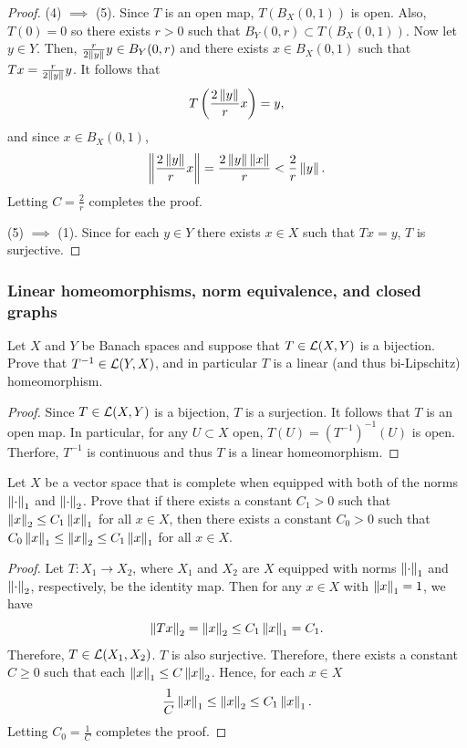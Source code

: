 \documentclass[a4paper]{article}
\begin{document}
\begin{proof}
  (4) $\implies$ (5). Since $T$ is an open map, $T(B_X(0, 1))$ is
  open. Also, $T(0) = 0$ so there exists $r > 0$ such that
  $B_Y(0, r) \subset T(B_X(0, 1))$. Now let $y \in Y$. Then,
  $\frac{r}{2 \left\lVert y\right\rVert} y \in B_Y(0, r)$ and there exists
  $x \in B_X(0, 1)$ such that $Tx = \frac{r}{2 \left\lVert y\right\rVert} y$.
  It follows that
  \[
  T \left( \frac{2\left\lVert y\right\rVert}{r} x \right) = y,
  \]
  and since $x \in B_X(0, 1)$,
  \[
  \left\lVert \frac{2 \left\lVert y\right\rVert}{r} x\right\rVert = \frac{2 \left\lVert y\right\rVert \left\lVert x\right\rVert}{r}
  < \frac{2}{r} \left\lVert y\right\rVert.
  \]
  Letting $C = \frac{2}{r}$ completes the proof.

  (5) $\implies$ (1). Since for each $y \in Y$ there exists
  $x \in X$ such that $T x = y$, $T$ is surjective.

\end{proof}

\subsubsection*{Linear homeomorphisms, norm equivalence,
and closed graphs}
\begin{thm}
  Let $X$ and $Y$ be Banach spaces and suppose that
  $T \in \mathcal{L}(X,Y)$ is a bijection.  Prove that $T^{-1}
  \in \mathcal{L}(Y,X)$, and in particular $T$ is a linear
  (and thus bi-Lipschitz) homeomorphism.
\end{thm}

\begin{proof}
  Since $T \in \mathcal{L}(X, Y)$ is a bijection, $T$ is a surjection.
  It follows that $T$ is an open map. In particular, for any
  $U \subset X$ open, $T(U) = (T^{-1})^{-1}(U)$ is open. Therfore,
  $T^{-1}$ is continuous and thus $T$ is a linear homeomorphism.

\end{proof}

\begin{thm}
Let $X$ be a vector space that is complete when equipped
with both of the norms $\left\lVert \cdot\right\rVert_1$ and
$\left\lVert \cdot\right\rVert_2$.  Prove that if there exists a constant
$C_1>0$ such that $\left\lVert x\right\rVert_2 \le C_1 \left\lVert x\right\rVert_1$ for all
$x \in X$, then there exists a constant $C_0 >0$ such that
$C_0 \left\lVert x\right\rVert_1 \le \left\lVert x\right\rVert_2 \le C_1 \left\lVert x\right\rVert_1$ for all
$x \in X$.
\end{thm}

\begin{proof}
Let $T: X_1 \to X_2$, where $X_1$ and $X_2$
are $X$ equipped with norms $\left\lVert \cdot\right\rVert_1$ and $\left\lVert \cdot\right\rVert_2$,
respectively, be the identity map. Then for any $x \in X$
with $\left\lVert x\right\rVert_1 = 1$, we have
\[
\left\lVert T x\right\rVert_2 = \left\lVert x\right\rVert_2 \leq C_1 \left\lVert x\right\rVert_1 = C_1.
\]
Therefore, $T \in \mathcal{L}(X_1, X_2)$. $T$ is also surjective.
Therefore, there exists a constant $C \geq 0$ such that
each $\left\lVert x\right\rVert_1 \leq C \left\lVert x\right\rVert_2$. Hence, for each
$x \in X$
\[
\frac{1}{C} \left\lVert x\right\rVert_1 \leq \left\lVert x\right\rVert_2 \leq C_1 \left\lVert x\right\rVert_1.
\]
Letting $C_0 = \frac{1}{C}$ completes the proof.

\end{proof}
\end{document}
